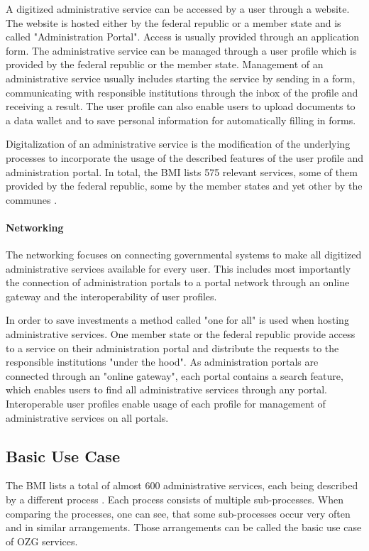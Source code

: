 A digitized administrative service can be accessed by a user through a website. The website is hosted either by the federal republic or a member state and is called "Administration Portal". Access is usually provided through an application form. The administrative service can be managed through a user profile which is provided by the federal republic or the member state. Management of an administrative service usually includes starting the service by sending in a form, communicating with responsible institutions through the inbox of the profile and receiving a result. The user profile can also enable users to upload documents to a data wallet and to save personal information for automatically filling in forms.

Digitalization of an administrative service is the modification of the underlying processes to incorporate the usage of the described features of the user profile and administration portal. In total, the BMI lists 575 relevant services, some of them provided by the federal republic, some by the member states and yet other by the communes \cite{BMI:Onlinezugangsgesetz}.

\paragraph{Networking}
The networking focuses on connecting governmental systems to make all digitized administrative services available for every user. This includes most importantly the connection of administration portals to a portal network through an online gateway and the interoperability of user profiles.

In order to save investments a method called "one for all" is used when hosting administrative services. One member state or the federal republic provide access to a service on their administration portal and distribute the requests to the responsible institutions "under the hood". As administration portals are connected through an "online gateway", each portal contains a search feature, which enables users to find all administrative services through any portal. Interoperable user profiles enable usage of each profile for management of administrative services on all portals.

\subsection{Basic Use Case}
The BMI lists a total of almost 600 administrative services, each being described by a different process \cite{BMI:Informatiosplattform}. Each process consists of multiple sub-processes. When comparing the processes, one can see, that some sub-processes occur very often and in similar arrangements. Those arrangements can be called the basic use case of OZG services.

